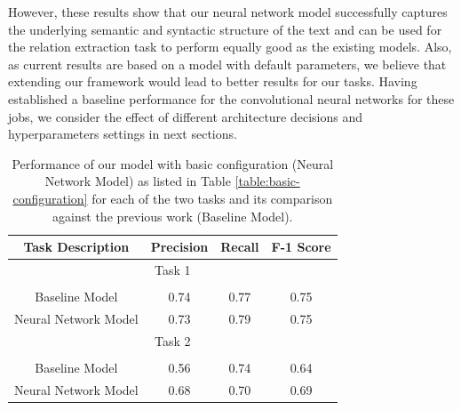 However, these results show that our neural network model successfully captures the underlying semantic and syntactic structure of the text and can be used for the relation extraction task to perform equally good as the existing models. Also, as current results are based on a model with default parameters, we believe that extending our framework would lead to better results for our tasks. Having established a baseline performance for the convolutional neural networks for these jobs, we consider the effect of different architecture decisions and hyperparameters settings in next sections.

\begin{table}[ht]
    \centering
    \caption{Performance of our model with basic configuration (Neural Network Model) as listed in Table \ref{table:basic-configuration} for each of the two tasks and its comparison against the previous work (Baseline Model).}
    \begin{tabular}{c  c  c  c}
         \toprule
         \textbf{Task Description}  &   \textbf{Precision}      &   \textbf{Recall}            &   \textbf{F-1 Score}      \\
         \midrule
         \multicolumn{4}{c}{Task 1}                             \\
         \hline
         \\[-1em]
         
         Baseline Model             &   0.74                    &             0.77                       &   0.75                    \\
         
         Neural Network Model       &   0.73                    &             0.79                       &   0.75                    \\
         
         \midrule
         \multicolumn{4}{c}{Task 2}                            \\
         \hline
         \\[-1em]
         
         Baseline Model             &   0.56                    &             0.74                       &   0.64                    \\
         
         Neural Network Model       &   0.68                    &             0.70                       &   0.69                    \\
         
         \bottomrule
    \end{tabular}
    \label{table:basic-results}
\end{table}

